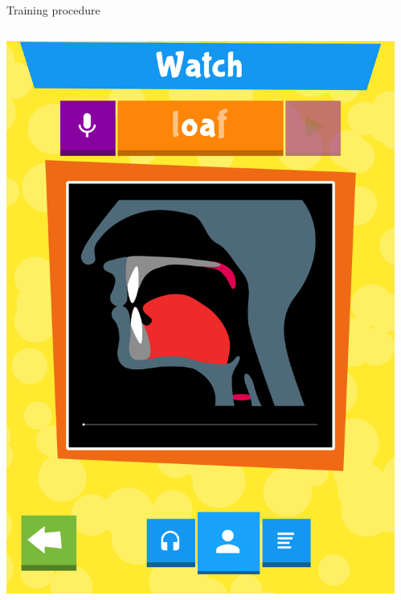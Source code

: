 \documentclass[final,xcolor={cmyk,hyperref}]{beamer}
\begin{document}
\begin{frame}[t]
\begin{columns}[t]
\begin{column}{0.45\linewidth}
\begin{block}{Training procedure}
\begin{columns}
\begin{column}{\screenshotwidth}
    \includegraphics[width=\linewidth]{images/CALVin-screenshots/jpgs/vocal_tract_animation}
  \end{column}
  \begin{column}{\screenshotwidth}

\end{column}
\end{columns}
\end{block}
\end{column}
\end{columns}
\end{frame}
\end{document}
